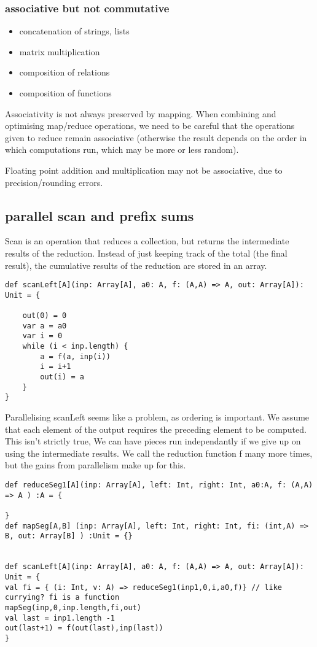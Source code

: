 \subsubsection{associative but not commutative}
\begin{itemize}
    \item concatenation of strings, lists
    \item matrix multiplication
    \item composition of relations
    \item composition of functions 
\end{itemize}

Associativity is not always preserved by mapping. When combining and optimising map/reduce operations, we need to be careful that the operations given to reduce remain associative (otherwise the result depends on the order in which computations run, which may be more or less random).

Floating point addition and multiplication may not be associative, due to precision/rounding errors.

\subsection{parallel scan and prefix sums}

Scan is an operation that  reduces a collection, but returns the intermediate results of the reduction. Instead of just keeping track of the total (the final result), the cumulative results of the reduction are stored in an array.

\begin{lstlisting}
def scanLeft[A](inp: Array[A], a0: A, f: (A,A) => A, out: Array[A]): Unit = {
    
    out(0) = 0
    var a = a0
    var i = 0
    while (i < inp.length) {
        a = f(a, inp(i))
        i = i+1
        out(i) = a
    }
}
\end{lstlisting}

Parallelising scanLeft seems like a problem, as ordering is important. We assume that each element of the output requires the preceding element to be computed. This isn't strictly true, We can have pieces run independantly if we give up on using the intermediate results. We call the reduction function f many more times, but the gains from parallelism make up for this.

\begin{lstlisting}
def reduceSeg1[A](inp: Array[A], left: Int, right: Int, a0:A, f: (A,A) => A ) :A = {
    
}
def mapSeg[A,B] (inp: Array[A], left: Int, right: Int, fi: (int,A) => B, out: Array[B] ) :Unit = {}


def scanLeft[A](inp: Array[A], a0: A, f: (A,A) => A, out: Array[A]): Unit = {
val fi = { (i: Int, v: A) => reduceSeg1(inp1,0,i,a0,f)} // like currying? fi is a function
mapSeg(inp,0,inp.length,fi,out)
val last = inp1.length -1
out(last+1) = f(out(last),inp(last))
}
\end{lstlisting}


